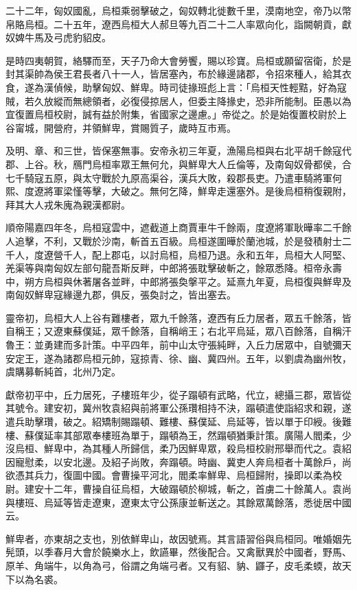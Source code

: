 \begin{pinyinscope}
二十二年，匈奴國亂，烏桓乘弱擊破之，匈奴轉北徙數千里，漠南地空，帝乃以幣帛賂烏桓。二十五年，遼西烏桓大人郝旦等九百二十二人率眾向化，詣闕朝貢，獻奴婢牛馬及弓虎豹貂皮。

是時四夷朝賀，絡驛而至，天子乃命大會勞饗，賜以珍寶。烏桓或願留宿衛，於是封其渠帥為侯王君長者八十一人，皆居塞內，布於緣邊諸郡，令招來種人，給其衣食，遂為漢偵候，助擊匈奴、鮮卑。時司徒掾班彪上言：「烏桓天性輕黠，好為寇賊，若久放縱而無總領者，必復侵掠居人，但委主降掾史，恐非所能制。臣愚以為宜復置烏桓校尉，誠有益於附集，省國家之邊慮。」帝從之。於是始復置校尉於上谷甯城，開營府，并領鮮卑，賞賜質子，歲時互市焉。

及明、章、和三世，皆保塞無事。安帝永初三年夏，漁陽烏桓與右北平胡千餘寇代郡、上谷。秋，鴈門烏桓率眾王無何允，與鮮卑大人丘倫等，及南匈奴骨都侯，合七千騎寇五原，與太守戰於九原高渠谷，漢兵大敗，殺郡長吏。乃遣車騎將軍何熙、度遼將軍梁慬等擊，大破之。無何乞降，鮮卑走還塞外。是後烏桓稍復親附，拜其大人戎朱廆為親漢都尉。

順帝陽嘉四年冬，烏桓寇雲中，遮截道上商賈車牛千餘兩，度遼將軍耿曄率二千餘人追擊，不利，又戰於沙南，斬首五百級。烏桓遂圍曄於蘭池城，於是發積射士二千人，度遼營千人，配上郡屯，以討烏桓，烏桓乃退。永和五年，烏桓大人阿堅、羌渠等與南匈奴左部句龍吾斯反畔，中郎將張耽擊破斬之，餘眾悉降。桓帝永壽中，朔方烏桓與休著屠各並畔，中郎將張奐搫平之。延熹九年夏，烏桓復與鮮卑及南匈奴鮮卑寇緣邊九郡，俱反，張奐討之，皆出塞去。

靈帝初，烏桓大人上谷有難樓者，眾九千餘落，遼西有丘力居者，眾五千餘落，皆自稱王；又遼東蘇僕延，眾千餘落，自稱峭王；右北平烏延，眾八百餘落，自稱汗魯王：並勇建而多計策。中平四年，前中山太守張純畔，入丘力居眾中，自號彌天安定王，遂為諸郡烏桓元帥，寇掠青、徐、幽、冀四州。五年，以劉虞為幽州牧，虞購募斬純首，北州乃定。

獻帝初平中，丘力居死，子樓班年少，從子蹋頓有武略，代立，總攝三郡，眾皆從其號令。建安初，冀州牧袁紹與前將軍公孫瓚相持不決，蹋頓遣使詣紹求和親，遂遣兵助擊瓚，破之。紹矯制賜蹋頓、難樓、蘇僕延、烏延等，皆以單于印綬。後難樓、蘇僕延率其部眾奉樓班為單于，蹋頓為王，然蹋頓猶秉計策。廣陽人閻柔，少沒烏桓、鮮卑中，為其種人所歸信，柔乃因鮮卑眾，殺烏桓校尉邢舉而代之。袁紹因寵慰柔，以安北邊。及紹子尚敗，奔蹋頓。時幽、冀吏人奔烏桓者十萬餘戶，尚欲憑其兵力，復圖中國。會曹操平河北，閻柔率鮮卑、烏桓歸附，操即以柔為校尉。建安十二年，曹操自征烏桓，大破蹋頓於柳城，斬之，首虜二十餘萬人。袁尚與樓班、烏延等皆走遼東，遼東太守公孫康並斬送之。其餘眾萬餘落，悉徙居中國云。

鮮卑者，亦東胡之支也，別依鮮卑山，故因號焉。其言語習俗與烏桓同。唯婚姻先髡頭，以季春月大會於饒樂水上，飲讌畢，然後配合。又禽獸異於中國者，野馬、原羊、角端牛，以角為弓，俗謂之角端弓者。又有貂、豽、鼲子，皮毛柔蝡，故天下以為名裘。


\end{pinyinscope}
